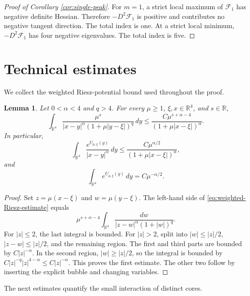 \documentclass[11pt]{article}
\newtheorem{lemma}[theorem]{Lemma}
\numberwithin{equation}{section}
\begin{document}
\begin{proof}[Proof of Corollary \ref{cor:single-peak}]
For $m=1$, a strict local maximum of $\mathcal F_1$ has negative definite Hessian. Therefore
$-D^2\mathcal F_1$ is positive and contributes no negative tangent direction. The total index is one. At a strict local minimum,
$-D^2\mathcal F_1$ has four negative eigenvalues. The total index is five.
\end{proof}

\section{Technical estimates}

We collect the weighted Riesz-potential bound used throughout the proof.

\begin{lemma}\label{lem:weighted-Riesz}
Let $0<\alpha<4$ and $q>4$. For every $\mu\geq1$, $\xi,x\in\mathbb R^4$, and $s\in\mathbb R$,
\begin{equation}\label{eq:weighted-Riesz-estimate}
\int_{\mathbb R^4}
\frac{\mu^s}{|x-y|^\alpha(1+\mu|y-\xi|)^q}\,dy
\leq
\frac{C\mu^{s+\alpha-4}}
{(1+\mu|x-\xi|)^\alpha}.
\end{equation}
In particular,
\begin{equation}\label{eq:bubble-Riesz-bound}
\int_{\mathbb R^4}
\frac{e^{U_{\mu,\xi}(y)}}{|x-y|^\alpha}\,dy
\leq
\frac{C\mu^{\alpha/2}}
{(1+\mu|x-\xi|)^\alpha},
\end{equation}
and
\begin{equation}\label{eq:bubble-L1}
\int_{\mathbb R^4}e^{U_{\mu,\xi}(y)}\,dy
=C\mu^{-\alpha/2}.
\end{equation}
\end{lemma}

\begin{proof}
Set $z=\mu(x-\xi)$ and $w=\mu(y-\xi)$. The left-hand side of
\eqref{eq:weighted-Riesz-estimate} equals
\[
\mu^{s+\alpha-4}
\int_{\mathbb R^4}
\frac{dw}{|z-w|^\alpha(1+|w|)^q}.
\]
For $|z|\leq2$, the last integral is bounded. For $|z|>2$, split into
$|w|\leq|z|/2$, $|z-w|\leq|z|/2$, and the remaining region. The first and third parts are bounded by
$C|z|^{-\alpha}$. In the second region, $|w|\geq|z|/2$, so the integral is bounded by
$C|z|^{-q}|z|^{4-\alpha}\leq C|z|^{-\alpha}$. This proves the first estimate. The other two follow by inserting the explicit bubble and changing variables.
\end{proof}

The next estimates quantify the small interaction of distinct cores.
\end{document}
